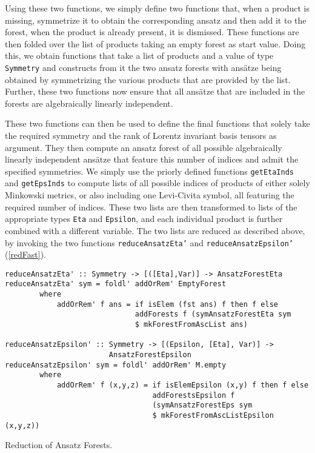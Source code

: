 Using these two functions, we simply define two functions that, when a product is missing, symmetrize it to obtain the corresponding ansatz and then add it to the forest, when the product is already present, it is dismissed. These functions are then folded over the list of products taking an empty forest as start value.  Doing this, we obtain functions that take a list of products and a value of type \texttt{Symmetry} and constructs from it the two ansatz forests with ansätze being obtained by symmetrizing the various products that are provided by the list. Further, these two functions now ensure that all ansätze that are included in the forests are algebraically linearly independent. 

These two functions can then be used to define the final functions that solely take the required symmetry and the rank of Lorentz invariant basis tensors as argument. They then compute an ansatz forest of all possible algebraically linearly independent ansätze that feature this number of indices and admit the specified symmetries. We simply use the priorly defined functions \texttt{getEtaInds} and \texttt{getEpsInds} to compute lists of all possible indices of products of either solely Minkowski metrics, or also including one Levi-Civita symbol, all featuring the required number of indices. These two lists are then transformed to lists of the appropriate types \texttt{Eta} and \texttt{Epsilon}, and each individual product is further combined with a different variable. The two lists are reduced as described above, by invoking the two functions \texttt{reduceAnsatzEta'} and \texttt{reduceAnsatzEpsilon'} (\ref{redFast}).
\begin{listing}[hbt!]
\begin{verbatim}
reduceAnsatzEta' :: Symmetry -> [([Eta],Var)] -> AnsatzForestEta
reduceAnsatzEta' sym = foldl' addOrRem' EmptyForest
        where
            addOrRem' f ans = if isElem (fst ans) f then f else
                              addForests f (symAnsatzForestEta sym 
                              $ mkForestFromAscList ans)

reduceAnsatzEpsilon' :: Symmetry -> [(Epsilon, [Eta], Var)] ->
                        AnsatzForestEpsilon
reduceAnsatzEpsilon' sym = foldl' addOrRem' M.empty
        where
            addOrRem' f (x,y,z) = if isElemEpsilon (x,y) f then f else
                                  addForestsEpsilon f 
                                  (symAnsatzForestEps sym 
                                  $ mkForestFromAscListEpsilon (x,y,z))  
\end{verbatim} 
\caption{Reduction of Ansatz Forests.}\label{redFast}
\end{listing}

